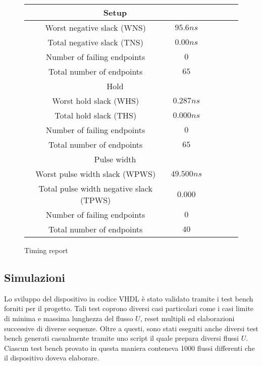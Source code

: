 \begin{figure}[!ht]
    \centering
    \begin{tabular}{|c|c|c|c|c|c|}
        \hline
        \multicolumn{2}{|c|}{Setup}                          \\
        \hline
        Worst negative slack (WNS)              & $95.6ns$   \\
        \hline
        Total negative slack (TNS)              & $0.00ns$   \\
        \hline
        Number of failing endpoints             & $0$        \\
        \hline
        Total number of endpoints               & $65$       \\
        \hline
        \multicolumn{2}{|c|}{Hold}                           \\
        \hline
        Worst hold slack (WHS)                  & $0.287ns$  \\
        \hline
        Total hold slack (THS)                  & $0.000ns$  \\
        \hline
        Number of failing endpoints             & $0$        \\
        \hline
        Total number of endpoints               & $65$       \\
        \hline
        \multicolumn{2}{|c|}{Pulse width}                    \\
        \hline
        Worst pulse width slack (WPWS)          & $49.500ns$ \\
        \hline
        Total pulse width negative slack (TPWS) & $0.000$    \\
        \hline
        Number of failing endpoints             & $0$        \\
        \hline
        Total number of endpoints               & $40$       \\
        \hline
    \end{tabular}
    \caption{Timing report}
    \label{table:timingreport}
\end{figure}

\subsection{Simulazioni}

Lo sviluppo del dispositivo in codice VHDL è stato validato tramite i test bench forniti per il progetto. Tali test coprono diversi casi particolari come i casi limite di minima e massima lunghezza del flusso $U$, reset multipli ed elaborazioni successive di diverse sequenze. Oltre a questi, sono stati eseguiti anche diversi test bench generati casualmente tramite uno script il quale prepara diversi flussi $U$. Ciascun test bench provato in questa maniera conteneva 1000 flussi differenti che il dispositivo doveva elaborare.

